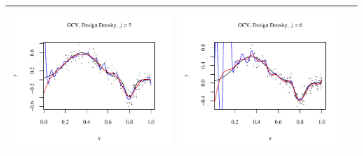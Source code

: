 \documentclass[11pt]{article}
\begin{document}
\begin{table}[h!]
\begin{center}
\begin{tabular}{| >{\centering\arraybackslash}m{2.1in} |  >{\centering\arraybackslash}m{2.1in} |  >{\centering\arraybackslash}m{2.1in}|}
      \includegraphics[width=1\linewidth,height=0.18\textheight]{Graphs/2/2/assignment5_a_2_2_5}&
      \includegraphics[width=1\linewidth,height=0.18\textheight]{Graphs/2/2/assignment5_a_2_2_6}\\\hline
    \end{tabular}
  \end{center}
\end{table}
\end{document}
